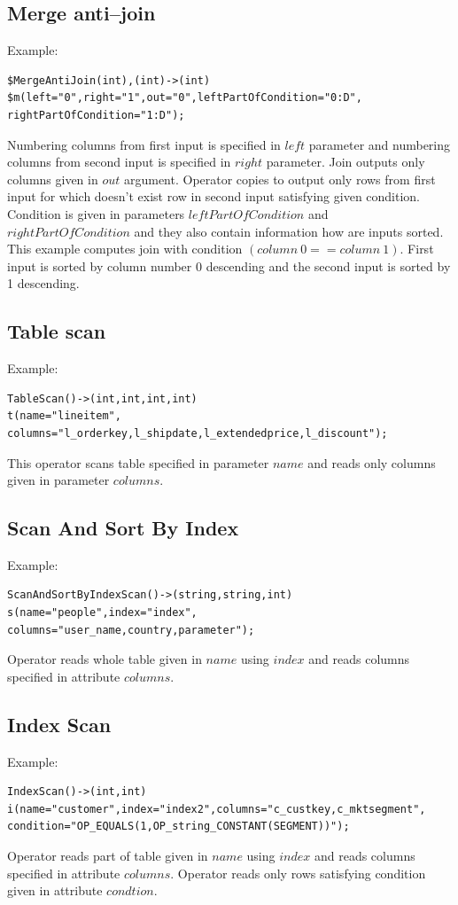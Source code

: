 \subsection{Merge anti--join}
Example:
\begin{lstlisting}
$MergeAntiJoin(int),(int)->(int)
$m(left="0",right="1",out="0",leftPartOfCondition="0:D",
rightPartOfCondition="1:D");
\end{lstlisting}

Numbering columns from first input is specified in $left$ parameter and numbering columns from second input is specified in $right$ parameter. Join outputs only columns given in $out$ argument. Operator copies to output only rows from first input for which doesn't exist row in second input satisfying given condition.
Condition is given in parameters $leftPartOfCondition$ and $rightPartOfCondition$ and they also contain information how are inputs sorted. This example computes join with condition $(column~0==column~1)$. First input is sorted by column number 0 descending and the second input is sorted by 1 descending.

\subsection{Table scan}
Example:
\begin{lstlisting}
TableScan()->(int,int,int,int)
t(name="lineitem",
columns="l_orderkey,l_shipdate,l_extendedprice,l_discount");
\end{lstlisting}
This operator scans table specified in parameter $name$ and reads only columns given in parameter $columns$.

\subsection{Scan And Sort By Index}
Example:
\begin{lstlisting}
ScanAndSortByIndexScan()->(string,string,int)
s(name="people",index="index",
columns="user_name,country,parameter"); 
\end{lstlisting}
Operator reads whole table given in $name$ using $index$ and reads columns specified in attribute $columns$.

\subsection{Index Scan}

Example:
\begin{lstlisting}
IndexScan()->(int,int)
i(name="customer",index="index2",columns="c_custkey,c_mktsegment",
condition="OP_EQUALS(1,OP_string_CONSTANT(SEGMENT))");
\end{lstlisting}
Operator reads part of table given in $name$ using $index$ and reads columns specified in attribute $columns$. Operator reads only rows satisfying condition given in attribute $condtion$.



